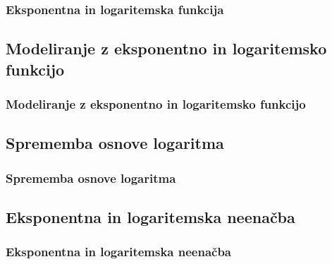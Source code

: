         \begin{frame}
            \frametitle{Eksponentna in logaritemska funkcija}
        \end{frame}

    \subsection{Modeliranje z eksponentno in logaritemsko funkcijo}

        \begin{frame}
            \frametitle{Modeliranje z eksponentno in logaritemsko funkcijo}
        \end{frame}

    \subsection{Sprememba osnove logaritma}

        \begin{frame}
            \frametitle{Sprememba osnove logaritma}
        \end{frame}

    \subsection{Eksponentna in logaritemska neenačba}

        \begin{frame}
            \frametitle{Eksponentna in logaritemska neenačba}
        \end{frame}

